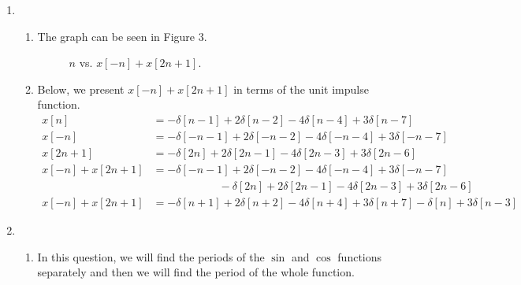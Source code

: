 \documentclass[10pt,a4paper, margin=1in]{article}
\begin{document}
\begin{enumerate}
   
    
\item      
    \begin{enumerate}
    \item %
    The graph can be seen in Figure 3. \\
    \begin{figure} [H]
    \centering
    \caption{$n$ vs. $x[-n]+x[2n+1]$.}
    \label{fig:q3}
\end{figure}

    \item %
    Below, we present $x[-n] + x[2n+1]$ in terms of the unit impulse function.
	\begin{equation}
	\begin{split}
		x[n] & = -\delta[n - 1] + 2\delta[n - 2] -4\delta[n-4] + 3\delta[n-7]\\
		x[-n] & = -\delta[-n - 1] + 2\delta[-n - 2] -4\delta[-n-4] + 3\delta[-n-7]\\
		x[2n+1] & = -\delta[2n] + 2\delta[2n - 1] -4\delta[2n - 3] + 3\delta[2n - 6]\\
		x[-n] + x[2n+1] & = -\delta[-n - 1] + 2\delta[-n - 2] -4\delta[-n-4] + 3\delta[-n-7]\\
		& \qquad \qquad \qquad - \delta[2n] + 2\delta[2n - 1] -4\delta[2n - 3] + 3\delta[2n - 6]\\
		x[-n] + x[2n+1] & = -\delta[n + 1] + 2\delta[n + 2] -4\delta[n + 4] + 3\delta[n + 7] - \delta[n] + 3\delta[n - 3]
	\end{split}
	\end{equation}
    
    \end{enumerate}

\item 
    \begin{enumerate}
    \item %
    	In this question, we will find the periods of the $\sin$ and $\cos$ functions separately and then we will find the period of the whole function.
	

\end{enumerate}
\end{enumerate}
\end{document}
